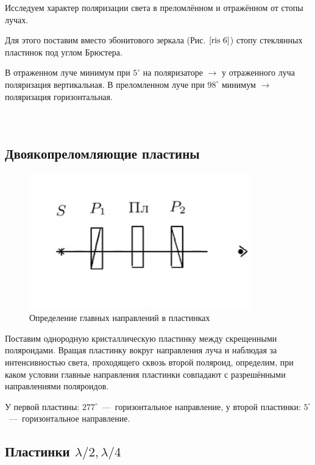 \documentclass[a4paper, 12pt]{article}
\begin{document}
Исследуем характер поляризации света в преломлённом и отражённом от стопы лучах. 

Для этого поставим вместо эбонитового зеркала (Рис. $\ref{ris 6}$) стопу стеклянных пластинок под углом Брюстера.

В отраженном луче минимум при $5^\circ$ на поляризаторе $\rightarrow$ у отраженного луча поляризация вертикальная. В преломленном луче при $98^\circ$ минимум $\rightarrow$ поляризация горизонтальная.
\\\\\\

\subsection{Двоякопреломляющие пластины}
\begin{figure}
	\includegraphics[width=\linewidth]{7}
	\caption{Определение главных
		направлений в пластинках}
	\label{ris 7}
\end{figure}

Поставим однородную кристаллическую пластинку между скрещенными поляроидами. Вращая пластинку вокруг направления луча и наблюдая за интенсивностью света, проходящего сквозь второй поляроид, определим, при каком условии главные направления пластинки совпадают с разрешёнными направлениями поляроидов.

У первой пластины: $277^\circ$~---~горизонтальное направление, у второй пластинки: $5^\circ$~---~горизонтальное направление.

\subsection{Пластинки $ \lambda/2, \lambda/4 $}
\end{document}
